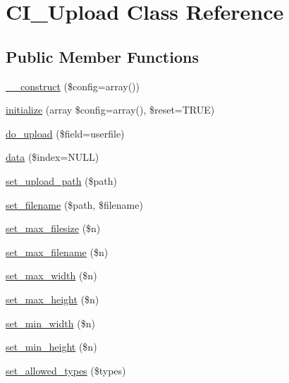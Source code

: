 \hypertarget{class_c_i___upload}{}\section{C\+I\+\_\+\+Upload Class Reference}
\label{class_c_i___upload}
\subsection*{Public Member Functions}
\begin{DoxyCompactItemize}
\item 
\mbox{\hyperlink{class_c_i___upload_a446f5c9d78b675eb696970ac51f7905a}{\+\_\+\+\_\+construct}} (\$config=array())
\item 
\mbox{\hyperlink{class_c_i___upload_a4aaf1074d6383b0ad00cf52bd44cdb6f}{initialize}} (array \$config=array(), \$reset=T\+R\+UE)
\item 
\mbox{\hyperlink{class_c_i___upload_a7e8e05902b2bcfebd4c012c60eb8e97b}{do\+\_\+upload}} (\$field=\textquotesingle{}userfile\textquotesingle{})
\item 
\mbox{\hyperlink{class_c_i___upload_a8b4fd00820d05f8f159d436594c72af6}{data}} (\$index=N\+U\+LL)
\item 
\mbox{\hyperlink{class_c_i___upload_a375727ece6d87a17328fd19ba3e8f4f0}{set\+\_\+upload\+\_\+path}} (\$path)
\item 
\mbox{\hyperlink{class_c_i___upload_a5c50a01f848fa3a12022e82d6a8ae340}{set\+\_\+filename}} (\$path, \$filename)
\item 
\mbox{\hyperlink{class_c_i___upload_a39c5a916b1ae99355bccaf4db056a30e}{set\+\_\+max\+\_\+filesize}} (\$n)
\item 
\mbox{\hyperlink{class_c_i___upload_a05aefd0ba3046cb20adf12356241fcd3}{set\+\_\+max\+\_\+filename}} (\$n)
\item 
\mbox{\hyperlink{class_c_i___upload_a6c02c4329b368eaac0c6719c3cb910df}{set\+\_\+max\+\_\+width}} (\$n)
\item 
\mbox{\hyperlink{class_c_i___upload_ab1a749e824f5f94e22258dea17d06139}{set\+\_\+max\+\_\+height}} (\$n)
\item 
\mbox{\hyperlink{class_c_i___upload_a03f270957d44271611b02d0a9efd321e}{set\+\_\+min\+\_\+width}} (\$n)
\item 
\mbox{\hyperlink{class_c_i___upload_a0a2346dbdbc48828e1c0c14941524a36}{set\+\_\+min\+\_\+height}} (\$n)
\item 
\mbox{\hyperlink{class_c_i___upload_a69675d1d2bb39bc95b889278799f383d}{set\+\_\+allowed\+\_\+types}} (\$types)

\end{DoxyCompactItemize}
